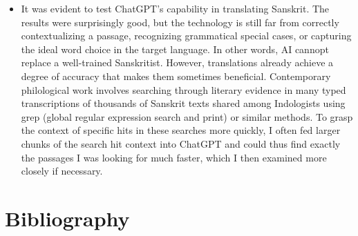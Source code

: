 \begin{itemize}
\item It was evident to test ChatGPT's capability in translating Sanskrit. The results were surprisingly good, but the technology is still far from correctly contextualizing a passage, recognizing grammatical special cases, or capturing the ideal word choice in the target language. In other words, AI cannopt replace a well-trained Sanskritist. However, translations already achieve a degree of accuracy that makes them sometimes beneficial. Contemporary philological work involves searching through literary evidence in many typed transcriptions of thousands of Sanskrit texts shared among Indologists using grep (global regular expression search and print) or similar methods. To grasp the context of specific hits in these searches more quickly, I often fed larger chunks of the search hit context into ChatGPT and could thus find exactly the passages I was looking for much faster, which I then examined more closely if necessary.
\end{itemize}
\cleardoublepage

\chapter{Bibliography}
 \label{sec:bibli}
\clearpage
\newpage 
\thispagestyle{empty}
\quad  \addtocounter{page}{-1}

\newrefcontext[sorting=tixel]
\printbibliography[heading=subbibintoc, title=Primary Sources, keyword=primary]

\newrefcontext[sorting=nyt]
\printbibliography[heading=subbibintoc, title=Secondary Literature, keyword=seclit]

\printbibliography[heading=subbibintoc, title=Catalogues, keyword=catalogues]

\printbibliography[heading=subbibintoc, title=Online Sources, keyword=onlinesource]




